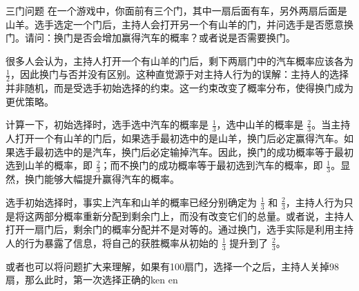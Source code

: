 \begin{example}{三门问题}
在一个游戏中，你面前有三个门，其中一扇后面有车，另外两扇后面是山羊。选手选定一个门后，主持人会打开另一个有山羊的门，并问选手是否愿意换门。请问：换门是否会增加赢得汽车的概率？或者说是否需要换门。
\end{example}

很多人会认为，主持人打开一个有山羊的门后，剩下两扇门中的汽车概率应该各为 $\displaystyle\frac{1}{2}$，因此换门与否并没有区别。这种直觉源于对主持人行为的误解：主持人的选择并非随机，而是受选手初始选择的约束。这一约束改变了概率分布，使得换门成为更优策略。

计算一下，初始选择时，选手选中汽车的概率是 $\displaystyle\frac{1}{3}$，选中山羊的概率是 $\displaystyle\frac{2}{3}$。当主持人打开一个有山羊的门后，如果选手最初选中的是山羊，换门后必定赢得汽车。如果选手最初选中的是汽车，换门后必定输掉汽车。因此，换门的成功概率等于最初选到山羊的概率，即 $\displaystyle\frac{2}{3}$；而不换门的成功概率等于最初选到汽车的概率，即 $\displaystyle\frac{1}{3}$。显然，换门能够大幅提升赢得汽车的概率。

选手初始选择时，事实上汽车和山羊的概率已经分别确定为 $\displaystyle\frac{1}{3}$ 和 $\displaystyle\frac{2}{3}$，主持人行为只是将这两部分概率重新分配到剩余门上，而没有改变它们的总量。或者说，主持人打开一扇门后，剩余门的概率分配并不是对等的。通过换门，选手实际是利用主持人的行为暴露了信息，将自己的获胜概率从初始的 $\displaystyle\frac{1}{3}$ 提升到了 $\displaystyle\frac{2}{3}$。

或者也可以将问题扩大来理解，如果有100扇门，选择一个之后，主持人关掉98扇，那么此时，第一次选择正确的ken en
